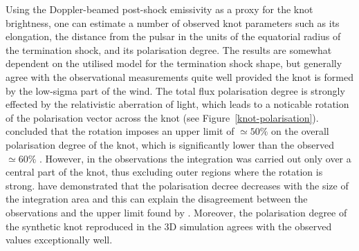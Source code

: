 Using the Doppler-beamed post-shock emissivity as a proxy for the knot brightness, one can estimate a number of observed  knot parameters such as its elongation, the distance from the pulsar in the units of the equatorial radius of the termination shock, and its polarisation degree.     The results are somewhat dependent on the  utilised model for the termination shock shape, but generally agree with the observational measurements quite well provided the knot is formed by the low-sigma part of the wind.  
The total flux polarisation degree is strongly effected by the relativistic aberration of light, which leads to a noticable rotation of the polarisation vector across the knot (see Figure~\ref{knot-polarisation}).  \citet{YB-15} concluded that the rotation imposes an upper limit 
of $\simeq 50\%$ on the overall polarisation degree of the knot, which is significantly lower than the observed $\simeq 60\%$ .  However, in the observations the integration was carried out only over a central part of the knot, thus excluding outer regions where the rotation is strong. \citet{LKP-16} have demonstrated that the polarisation decree decreases with the size of the integration area and this can explain the disagreement  between the observations and the upper limit found by \citet{YB-15}.      
Moreover, the polarisation degree of the synthetic knot reproduced in the 3D simulation \citep{} agrees with the observed values exceptionally well. 